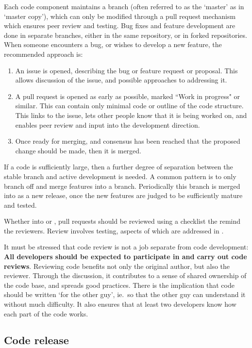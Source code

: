 Each code component maintains a  branch (often referred to as the `master'
as in `master copy'), which can only be modified
through a pull request mechanism which ensures peer review and testing. Bug fixes
and feature development are done in separate branches, either in the same
repository, or in forked repositories. When someone encounters a bug, or wishes to
develop a new feature, the recommended approach is:

\begin{enumerate}
\item An issue is opened, describing the bug or feature request or proposal. This
allows discussion of the issue, and possible approaches to addressing it.
\item A pull request is opened as early as possible, marked ``Work in
progress" or similar. This can contain only minimal code or outline
of the code structure. This links to the issue, lets other people
know that it is being worked on, and enables peer review and input
into the development direction.
\item Once ready for merging, and consensus has been reached that the proposed change
should be made, then it is merged.
\end{enumerate}

If a code is sufficiently large, then a further degree of separation between
the stable  branch and active development is needed. A common pattern
is to only branch off and merge features into a   branch. Periodically
this branch is merged into  as a new release, once the new features 
are judged to be sufficiently mature and tested.

Whether into  or , pull requests should be reviewed
using a checklist the remind the reviewers. 
Review involves testing, aspects of which are addressed in .

It must be stressed that code review is not a job separate from
code development: {\bf All developers should be expected to participate in
and carry out code reviews}. Reviewing code benefits not only the
original author, but also the reviewer. Through the discussion, it
contributes to a sense of shared ownership of the code base, and
spreads good practices. There is the implication that code should be
written `for the other guy', ie.\ so that the other guy can understand it
without much difficulty.  It also ensures that at least two developers
know how each part of the code works.

\subsection{Code release}


